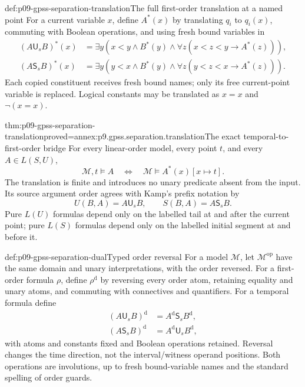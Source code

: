 \begin{hbdefinition}{def:p09-gpss-separation-translation}{The full first-order translation at a named point}
For a current variable \(x\), define \(A^*(x)\)
by translating \(q_i\) to \(q_i(x)\), commuting
with Boolean operations, and using fresh bound
variables in
\[
\begin{aligned}
 (A\mathbin{\mathsf U_s}B)^*(x)
 &=\exists y\left(x<y\land B^*(y)\land
                  \forall z(x<z<y\to A^*(z))\right),\\
 (A\mathbin{\mathsf S_s}B)^*(x)
 &=\exists y\left(y<x\land B^*(y)\land
                  \forall z(y<z<x\to A^*(z))\right).
\end{aligned}
\]
Each copied constituent receives fresh bound names;
only its free current-point variable is replaced.
Logical constants may be translated as \(x=x\)
and \(\neg(x=x)\).
\end{hbdefinition}

\begin{hblemma}{thm:p09-gpss-separation-translation}{proved=annex:p9.gpss.separation.translation}{The exact temporal-to-first-order bridge}
For every linear-order model, every point \(t\),
and every \(A\in L(S,U)\),
\[
                  \mathcal M,t\models A
                    \quad\Longleftrightarrow\quad
                  \mathcal M\models A^*(x)[x\mapsto t].
\]
The translation is finite and introduces no unary
predicate absent from the input. Its source argument
order agrees with Kamp's prefix notation by
\[
       U(B,A)=A\mathbin{\mathsf U_s}B,\qquad
       S(B,A)=A\mathbin{\mathsf S_s}B.
\]
Pure \(L(U)\) formulas depend only on the labelled
tail at and after the current point; pure \(L(S)\)
formulas depend only on the labelled initial segment
at and before it.
\end{hblemma}

\begin{hbdefinition}{def:p09-gpss-separation-dual}{Typed order reversal}
For a model \(\mathcal M\), let
\(\mathcal M^{\mathrm{op}}\) have the same domain
and unary interpretations, with the order reversed.
For a first-order formula \(\rho\), define
\(\rho^{\mathrm d}\) by reversing every order
atom, retaining equality and unary atoms, and
commuting with connectives and quantifiers.
For a temporal formula define
\[
\begin{aligned}
 (A\mathbin{\mathsf U_s}B)^{\mathrm d}
       &=A^{\mathrm d}\mathbin{\mathsf S_s}B^{\mathrm d},\\
 (A\mathbin{\mathsf S_s}B)^{\mathrm d}
       &=A^{\mathrm d}\mathbin{\mathsf U_s}B^{\mathrm d},
\end{aligned}
\]
with atoms and constants fixed and Boolean operations
retained. Reversal changes the time direction,
not the interval/witness operand positions.
Both operations are involutions, up to fresh
bound-variable names and the standard spelling
of order guards.
\end{hbdefinition}

